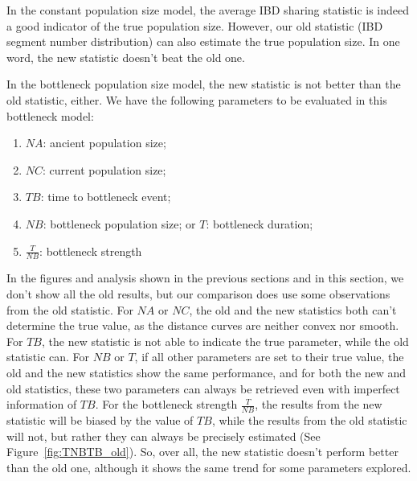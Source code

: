 \documentclass{bioinfo}
\begin{document}
In the constant population size model, the average IBD sharing statistic is indeed a good indicator of the true population size. However, our old statistic (IBD segment number distribution) can also estimate the true population size. In one word, the new statistic doesn't beat the old one.

In the bottleneck population size model, the new statistic is not better than the old statistic, either. We have the following parameters to be evaluated in this bottleneck model:

\begin{enumerate}
\item $NA$: ancient population size;
\item $NC$: current population size;
\item $TB$: time to bottleneck event;
\item $NB$: bottleneck population size; or $T$: bottleneck duration;
\item $\frac{T}{NB}$: bottleneck strength
\end{enumerate}

In the figures and analysis shown in the previous sections and in this section, we don't show all the old results, but our comparison does use some observations from the old statistic. For $NA$ or $NC$, the old and the new statistics both can't determine the true value, as the distance curves are neither convex nor smooth. For $TB$, the new statistic is not able to indicate the true parameter, while the old statistic can. For $NB$ or $T$, if all other parameters are set to their true value, the old and the new statistics show the same performance, and for both the new and old statistics, these two parameters can always be retrieved even with imperfect information of $TB$. For the bottleneck strength $\frac{T}{NB}$, the results from the new statistic will be biased by the value of $TB$, while the results from the old statistic will not, but rather they can always be precisely estimated (See Figure~\ref{fig:TNBTB_old}). So, over all, the new statistic doesn't perform better than the old one, although it shows the same trend for some parameters explored.
\end{document}

